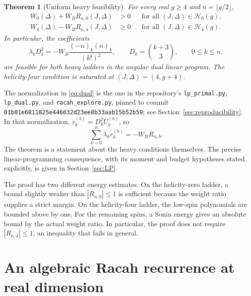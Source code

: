 \documentclass[11pt]{article}
\newtheorem{theorem}{Theorem}[section]
\theoremstyle{remark}
\numberwithin{equation}{section}
\newcommand{\WB}{W_B}
\newcommand{\cH}{\mathcal H}
\begin{document}
\begin{theorem}[Uniform heavy feasibility]
\label{thm:main}
For every real $g\ge4$ and $n=\lfloor g/2\rfloor$,
\begin{align}
 W_0(\Delta)+\WB R_{n,0}(J,\Delta)&>0
       &&\text{for all }(J,\Delta)\in\cH_0(g),\label{eq:main0}\\
 W_4(\Delta)-\WB R_{n,4}(J,\Delta)&\ge0
       &&\text{for all }(J,\Delta)\in\cH_4(g).
       \label{eq:main4}
\end{align}
In particular, the coefficients
\begin{equation}
 \boxed{\quad
 \lambda_kD_k^2=-\WB\frac{(-n)_k(n)_k}{(k!)^2},
 \qquad D_k=\binom{k+3}{3},\qquad 0\le k\le n,
 \quad}
 \label{eq:dual}
\end{equation}
are feasible for both heavy ladders in the angular dual linear program.
The helicity-four condition is saturated at $(J,\Delta)=(4,g+4)$.
\end{theorem}

The normalization in \eqref{eq:dual} is the one in the repository's
\texttt{lp\_primal.py}, \texttt{lp\_dual.py}, and
\texttt{racah\_explore.py}, pinned to commit
\texttt{01b01e6811825e446632d23ee8b33aab15b52b59}; see
Section~\ref{sec:reproducibility}. In that normalization,
$r_k^{(b)}=D_k^2U_k^{(b)}$, so
\begin{equation}
 \sum_{k=0}^n\lambda_kr_k^{(b)}=-\WB R_{n,b}.
 \label{eq:normalization}
\end{equation}
The theorem is a statement about the heavy conditions themselves. The precise
linear-programming consequence, with its moment and budget hypotheses stated
explicitly, is given in Section~\ref{sec:LP}.

The proof has two different energy estimates. On the helicity-zero ladder,
a bound slightly weaker than $|R_{n,0}|\le1$ is sufficient because the weight
ratio supplies a strict margin. On the helicity-four ladder, the low-spin
polynomials are bounded above by one. For the remaining spins, a Sonin energy
gives an absolute bound by the actual weight ratio. In particular, the proof
does not require $|R_{n,4}|\le1$, an inequality that fails in general.

\section{An algebraic Racah recurrence at real dimension}
\label{sec:recurrence}
\end{document}
